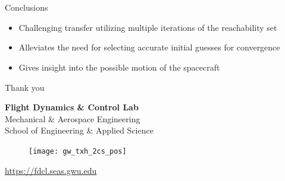 \documentclass[11pt,professionalfonts]{beamer}
\begin{document}
\section*{}
\subsection*{}

\begin{frame}{Conclusions} %
\begin{itemize}
    \item Challenging transfer utilizing multiple iterations of the reachability set
    \item Alleviates the need for selecting accurate initial guesses for convergence
    \item Gives insight into the possible motion of the spacecraft
\end{itemize}

\end{frame}   %

\begin{frame}[c]{Thank you}
  \centering
  
  \textbf{\large Flight Dynamics \& Control Lab} \\
  Mechanical \& Aerospace Engineering \\
  School of Engineering \& Applied Science
  
  \begin{figure} %
        \texttt{[image: gw\_txh\_2cs\_pos]}
    \end{figure}
  
  \url{https://fdcl.seas.gwu.edu}
\end{frame}
\end{document}
